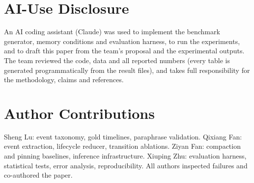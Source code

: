\documentclass[11pt]{article}
\begin{document}
\section*{AI-Use Disclosure}
An AI coding assistant (Claude) was used to implement the benchmark generator, memory conditions and evaluation harness, to run the experiments, and to draft this paper from the team's proposal and the experimental outputs. The team reviewed the code, data and all reported numbers (every table is generated programmatically from the result files), and takes full responsibility for the methodology, claims and references.

\section*{Author Contributions}
Sheng Lu: event taxonomy, gold timelines, paraphrase validation. Qixiang Fan: event extraction, lifecycle reducer, transition ablations. Ziyan Fan: compaction and pinning baselines, inference infrastructure. Xiuping Zhu: evaluation harness, statistical tests, error analysis, reproducibility. All authors inspected failures and co-authored the paper.


\end{document}
